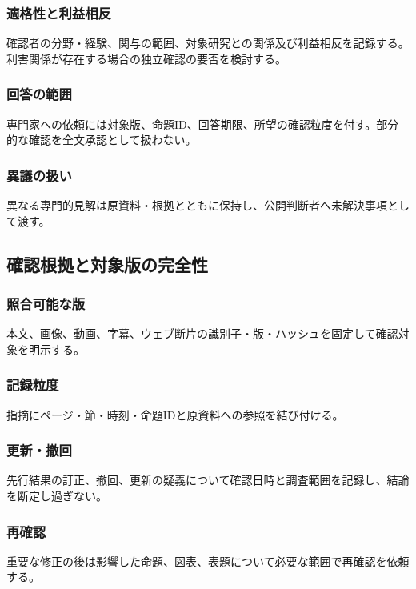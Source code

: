 \documentclass[a4paper,11pt]{article}
\begin{document}
\subsubsection{適格性と利益相反}
\par 確認者の分野・経験、関与の範囲、対象研究との関係及び利益相反を記録する。利害関係が存在する場合の独立確認の要否を検討する。\par\medskip
\subsubsection{回答の範囲}
\par 専門家への依頼には対象版、命題ID、回答期限、所望の確認粒度を付す。部分的な確認を全文承認として扱わない。\par\medskip
\subsubsection{異議の扱い}
\par 異なる専門的見解は原資料・根拠とともに保持し、公開判断者へ未解決事項として渡す。\par\medskip
\subsection{確認根拠と対象版の完全性}
\subsubsection{照合可能な版}
\par 本文、画像、動画、字幕、ウェブ断片の識別子・版・ハッシュを固定して確認対象を明示する。\par\medskip
\subsubsection{記録粒度}
\par 指摘にページ・節・時刻・命題IDと原資料への参照を結び付ける。\par\medskip
\subsubsection{更新・撤回}
\par 先行結果の訂正、撤回、更新の疑義について確認日時と調査範囲を記録し、結論を断定し過ぎない。\par\medskip
\subsubsection{再確認}
\par 重要な修正の後は影響した命題、図表、表題について必要な範囲で再確認を依頼する。\par\medskip
\end{document}

